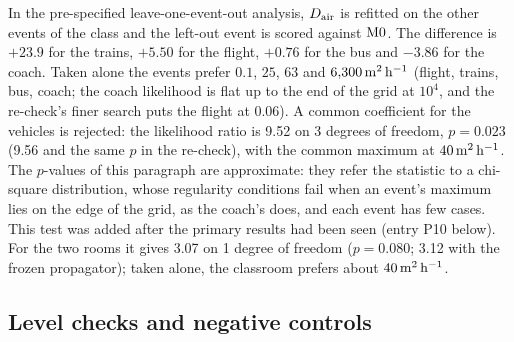 In the pre-specified leave-one-event-out analysis, $D_{\mathrm{air}}$ is refitted on the other events of the class and
the left-out event is scored against $\mathrm{M0}$. The difference is $+23.9$ for the trains, $+5.50$ for the
flight, $+0.76$ for the bus and $-3.86$ for the coach. Taken alone the events prefer $0.1$, $25$, $63$ and
$6{,}300\,\mathrm{m}^2\,\mathrm{h}^{-1}$ (flight, trains, bus, coach; the coach likelihood is flat up to the end of the grid at $10^4$,
and the re-check's finer search puts the flight at 0.06).
A common coefficient for the vehicles is rejected: the likelihood ratio is 9.52 on 3 degrees of freedom,
$p=0.023$ (9.56 and the same $p$ in the re-check), with the common maximum at $40\,\mathrm{m}^2\,\mathrm{h}^{-1}$. The $p$-values of this
paragraph are approximate: they refer the statistic to a chi-square distribution, whose regularity conditions
fail when an event's maximum lies on the edge of the grid, as the coach's does, and each event has few cases. This test was
added after the primary results had been seen (entry P10 below). For the two rooms it gives 3.07 on 1 degree
of freedom ($p=0.080$; 3.12 with the frozen propagator); taken alone, the classroom prefers about $40\,\mathrm{m}^2\,\mathrm{h}^{-1}$.

\subsection{Level checks and negative controls}\label{appC_protocol:sec:levels}

